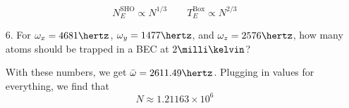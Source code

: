 \documentclass[a4paper,twoside]{article}
\begin{document}
\begin{itemize}
\begin{problem}
            \begin{equation}
                N_E^{\text{SHO}} \propto N^{1/3} \qquad T_E^{\text{Box}} \propto N^{2/3}
            \end{equation}
        \end{problem}
    \item[6.] For $ \omega_x = 4681\hertz $, $ \omega_y = 1477\hertz $, and $ \omega_z = 2576\hertz $, how many atoms should be trapped in a BEC at $ 2\milli\kelvin $?
        \begin{problem}
            With these numbers, we get $ \bar{\omega} = 2611.49\hertz $. Plugging in values for everything, we find that
            \begin{equation}
                N \approx 1.21163\times 10^6
            \end{equation}
        \end{problem}
\end{itemize}
\end{document}
